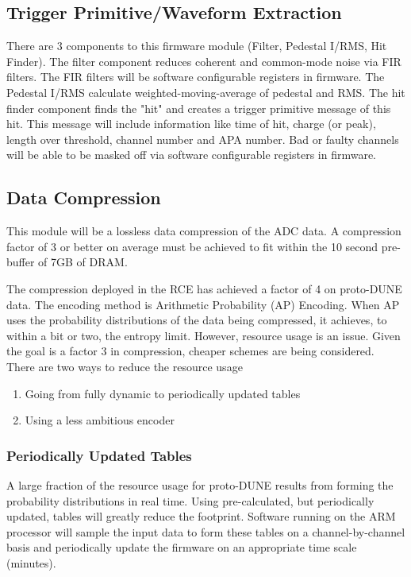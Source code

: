 \subsection{Trigger Primitive/Waveform Extraction}
There are 3 components to this firmware module (Filter, Pedestal I/RMS, Hit Finder).
The filter component reduces coherent and common-mode noise via FIR filters.  The FIR filters will be software configurable registers in firmware. The Pedestal I/RMS calculate weighted-moving-average of pedestal and RMS.  The hit finder component finds the "hit" and creates a trigger primitive message of this hit.  This message will include information like time of hit, charge (or peak), length over threshold, channel number and APA number. Bad or faulty channels will be able to be masked off via software configurable registers in firmware.

\subsection{Data Compression}
This module will be a lossless data compression of the ADC data. A compression factor of 3 or better on average must be achieved to fit within the 10 second pre-buffer of 7GB of DRAM.

The compression deployed in the RCE has achieved a factor of 4 on proto-DUNE data. The encoding method is Arithmetic Probability (AP) Encoding.  When AP uses the probability distributions of the data being compressed, it achieves, to within a bit or two, the entropy limit. However, resource usage is an issue. Given the goal is a factor 3 in compression, cheaper schemes are being considered.  There are two ways to reduce the resource usage

\begin{enumerate}
    \item Going from fully dynamic to periodically updated tables   
    \item Using a less ambitious encoder
\end{enumerate}


\subsubsection{Periodically Updated Tables}
A large fraction of the resource usage for proto-DUNE results from forming the probability distributions in real time. Using pre-calculated, but periodically updated, tables will greatly reduce the footprint. Software running on the ARM processor will sample the input data to form these tables on a channel-by-channel basis and periodically update the firmware on an appropriate time scale (minutes).


